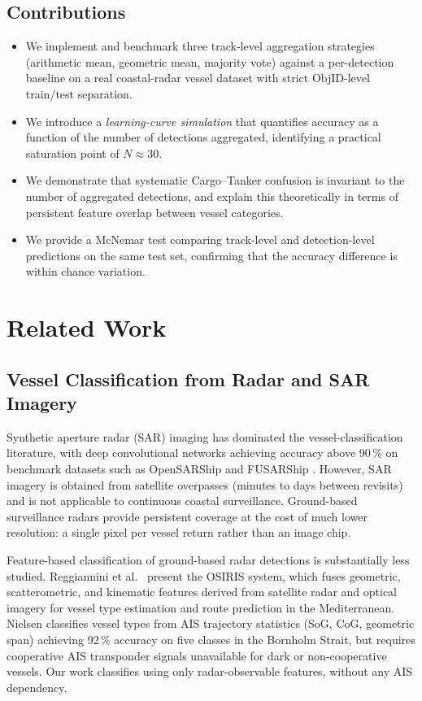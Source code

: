 \documentclass[10pt,journal,compsoc]{IEEEtran}
\begin{document}
\subsection{Contributions}

\begin{itemize}
\item We implement and benchmark three track-level aggregation strategies
      (arithmetic mean, geometric mean, majority vote) against a per-detection
      baseline on a real coastal-radar vessel dataset with strict ObjID-level
      train/test separation.
\item We introduce a \emph{learning-curve simulation} that quantifies accuracy
      as a function of the number of detections aggregated, identifying a
      practical saturation point of $N\!\approx\!30$.
\item We demonstrate that systematic Cargo--Tanker confusion is invariant to
      the number of aggregated detections, and explain this theoretically in
      terms of persistent feature overlap between vessel categories.
\item We provide a McNemar test comparing track-level and detection-level
      predictions on the same test set, confirming that the accuracy difference
      is within chance variation.
\end{itemize}

\section{Related Work}\label{sec:related}

\subsection{Vessel Classification from Radar and SAR Imagery}

Synthetic aperture radar (SAR) imaging has dominated the vessel-classification
literature, with deep convolutional networks achieving accuracy above
90\,\% on benchmark datasets such as OpenSARShip and FUSARShip
\cite{survey_sar_dl}.  However, SAR imagery is obtained from satellite
overpasses (minutes to days between revisits) and is not applicable to
continuous coastal surveillance.  Ground-based surveillance radars provide
persistent coverage at the cost of much lower resolution: a single pixel per
vessel return rather than an image chip.

Feature-based classification of ground-based radar detections is substantially
less studied.  Reggiannini et al.\ \cite{osiris_2024} present the OSIRIS
system, which fuses geometric, scatterometric, and kinematic features derived
from satellite radar and optical imagery for vessel type estimation and route
prediction in the Mediterranean.  Nielsen \cite{nielsen_2025} classifies vessel
types from AIS trajectory statistics (SoG, CoG, geometric span) achieving
92\,\% accuracy on five classes in the Bornholm Strait, but requires
cooperative AIS transponder signals unavailable for dark or non-cooperative
vessels.  Our work classifies using only radar-observable features, without
any AIS dependency.
\end{document}
